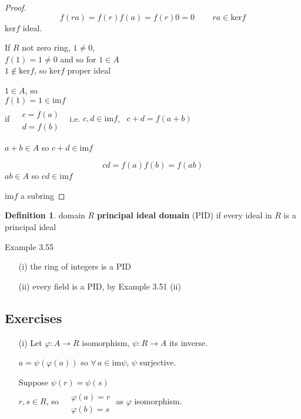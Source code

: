 \documentclass[twoside,landscape]{amsart}
\theoremstyle{plain}
\theoremstyle{definition}
\newtheorem{definition}{Definition}
\theoremstyle{remark}
\newcommand{\exercisehead}[1]
  { \smallskip
   \noindent{\small\bf Exercise #1.}
  }
\begin{document}
\begin{multicols*}{2}
\begin{proof}
\[
f(ra) = f(r)f(a) = f(r) 0 = 0 \quad \quad \, ra \in \text{ker}{f}
\]
$\text{ker}{f}$ ideal.  


If $R$ not zero ring, $1\neq 0$, \\
\phantom{if } $f(1) = 1 \neq 0$ and so for $1\in A$ \\
\phantom{if } \quad \quad $1 \notin \text{ker}{f}$, so $\text{ker}{f}$ proper ideal

$1 \in A$, so \\
$f(1) = 1 \in \text{im}{f}$ \\
if $\begin{aligned} & \quad \\ 
  & c = f(a) \\ 
  & d = f(b) \end{aligned}$ \, i.e. $c,d \in \text{im}{f}$, \, $c+d = f(a+b)$ 

$a+b \in A$ so $c+d \in \text{im}{f}$

\[
cd = f(a) f(b) = f(ab)
\]
$ab \in A$ so $cd \in \text{im}{f}$

$\text{im}{f}$ a subring

\end{proof}



\begin{definition}
  domain $R$ \textbf{principal ideal domain} (PID) if every ideal in $R$ is a principal ideal
\end{definition}

Example 3.55

\begin{enumerate}
  \item[(i)] the ring of integers is a PID 
\item[(ii)] every field is a PID, by Example 3.51 (ii)
\end{enumerate}




\subsection*{ Exercises} 

\exercisehead{3.39} 

\begin{enumerate}
  \item[(i)] Let $\varphi :A \to R$ isomorphism, $\psi : R \to A$ its inverse.  

$a = \psi(\varphi(a))$ so $\forall \, a \in \text{im}{\psi}$, $\psi$ surjective.  

Suppose $\psi(r) = \psi(s)$ \\
\quad $r,s \in R$, so $\begin{aligned} & \quad \\ 
  & \varphi(a) = r \\ 
  & \varphi(b) = s \end{aligned}$ \quad as $\varphi$ isomorphism.  


\end{enumerate}
\end{multicols*}
\end{document}
